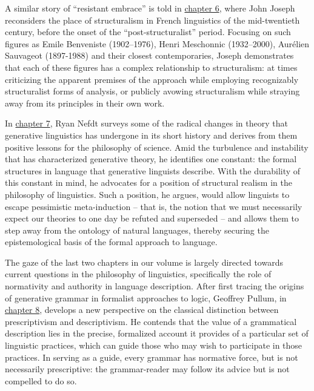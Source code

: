 \documentclass[output=paper]{langscibook}
\begin{document}
A similar story of ``resistant embrace'' is told in \hyperref[chap:joseph]{chapter 6}, where John Joseph reconsiders the place of structuralism in French linguistics of the mid-twentieth century, before the onset of the ``post-structuralist'' period. Focusing on such figures as Emile Benveniste (1902--1976), Henri Meschonnic (1932--2000), Aurélien Sauvageot (1897-1988) and their closest contemporaries, Joseph demonstrates that each of these figures has a complex relationship to structuralism: at times criticizing the apparent premises of the approach while employing recognizably structuralist forms of analysis, or publicly avowing structuralism while straying away from its principles in their own work.

In \hyperref[chap:nefdt]{chapter 7}, Ryan Nefdt surveys some of the radical changes in theory that generative linguistics has undergone in its short history and derives from them positive lessons for the philosophy of science. Amid the turbulence and instability that has characterized generative theory, he identifies one constant: the formal structures in language that generative linguists describe. With the durability of this constant in mind, he advocates for a position of structural realism in the philosophy of linguistics. Such a position, he argues, would allow linguists to escape pessimistic meta-induction -- that is, the notion that we must necessarily expect our theories to one day be refuted and superseded -- and allows them to step away from the ontology of natural languages, thereby securing the epistemological basis of the formal approach to language.

The gaze of the last two chapters in our volume is largely directed towards current questions in the philosophy of linguistics, specifically the role of normativity and authority in language description. After first tracing the origins of generative grammar in formalist approaches to logic, Geoffrey Pullum, in \hyperref[chap:pullum]{chapter 8}, develops a new perspective on the classical distinction between prescriptivism and descriptivism. He contends that the value of a grammatical description lies in the precise, formalized account it provides of a particular set of linguistic practices, which can guide those who may wish to participate in those practices. In serving as a guide, every grammar has normative force, but is not necessarily prescriptive: the grammar-reader may follow its advice but is not compelled to do so.
\end{document}
